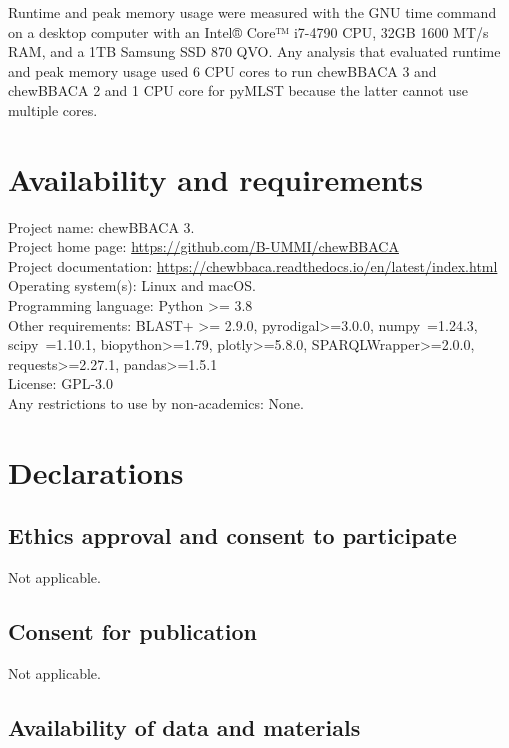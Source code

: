 Runtime and peak memory usage were measured with the GNU time command on a desktop computer with an Intel® Core™ i7-4790 CPU, 32GB 1600 MT/s RAM, and a 1TB Samsung SSD 870 QVO. Any analysis that evaluated runtime and peak memory usage used 6 CPU cores to run chewBBACA 3 and chewBBACA 2 and 1 CPU core for pyMLST because the latter cannot use multiple cores.

\section{Availability and requirements} \label{sec:ch2_availability_and_requirements}

\noindent Project name: chewBBACA 3.\\
Project home page: \url{https://github.com/B-UMMI/chewBBACA}\\
Project documentation: \url{https://chewbbaca.readthedocs.io/en/latest/index.html}\\
Operating system(s): Linux and macOS.\\
Programming language: Python >= 3.8\\
Other requirements: BLAST+ >= 2.9.0, pyrodigal>=3.0.0, numpy~=1.24.3, scipy~=1.10.1, biopython>=1.79, plotly>=5.8.0, SPARQLWrapper>=2.0.0, requests>=2.27.1, pandas>=1.5.1\\
License: GPL-3.0\\
Any restrictions to use by non-academics: None.

\section{Declarations} \label{sec:ch2_declarations}

\subsection{Ethics approval and consent to participate} \label{ssec:ch2_declarations_ssec1}

\noindent Not applicable.

\subsection{Consent for publication} \label{ssec:ch2_declarations_ssec2}

\noindent Not applicable.

\subsection{Availability of data and materials} \label{ssec:ch2_declarations_ssec3}

